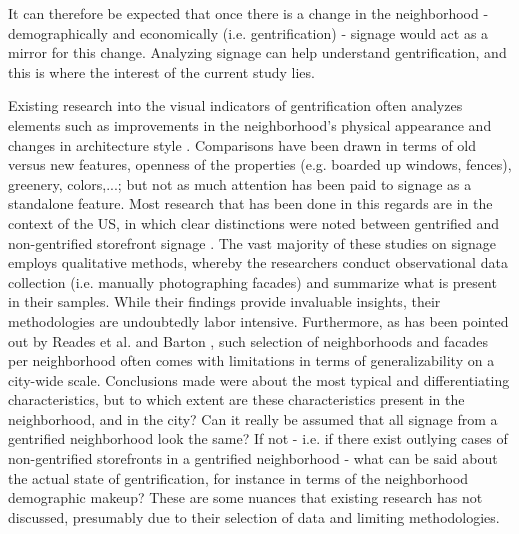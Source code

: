 It can therefore be expected that once there is a change in the neighborhood - demographically and economically (i.e. gentrification) - signage would act as a mirror for this change. Analyzing signage can help understand gentrification, and this is where the interest of the current study lies.

Existing research into the visual indicators of gentrification often analyzes elements such as improvements in the neighborhood's physical appearance and changes in architecture style \cite{huang_detecting_2022, ravuri_gsv_2022, naik_computer_2017, ilic_deepmap_2019}. Comparisons have been drawn in terms of old versus new features, openness of the properties (e.g. boarded up windows, fences), greenery, colors,...; but not as much attention has been paid to signage as a standalone feature. Most research that has been done in this regards are in the context of the US, in which clear distinctions were noted between gentrified and non-gentrified storefront signage \cite{trinch_signsays_2017, snajdr_oldschool_2018, snajdr_preserve_2022, rahman_signage_2020}. The vast majority of these studies on signage employs qualitative methods, whereby the researchers conduct observational data collection (i.e. manually photographing facades) and summarize what is present in their samples. While their findings provide invaluable insights, their methodologies are undoubtedly labor intensive. Furthermore, as has been pointed out by Reades et al. \cite{reades_understanding_2019} and Barton \cite{barton_exploration_2016}, such selection of neighborhoods and facades per neighborhood often comes with limitations in terms of generalizability on a city-wide scale. Conclusions made were about the most typical and differentiating characteristics, but to which extent are these characteristics present in the neighborhood, and in the city? Can it really be assumed that all signage from a gentrified neighborhood look the same? If not - i.e. if there exist outlying cases of non-gentrified storefronts in a gentrified neighborhood - what can be said about the actual state of gentrification, for instance in terms of the neighborhood demographic makeup? These are some nuances that existing research has not discussed, presumably due to their selection of data and limiting methodologies.

